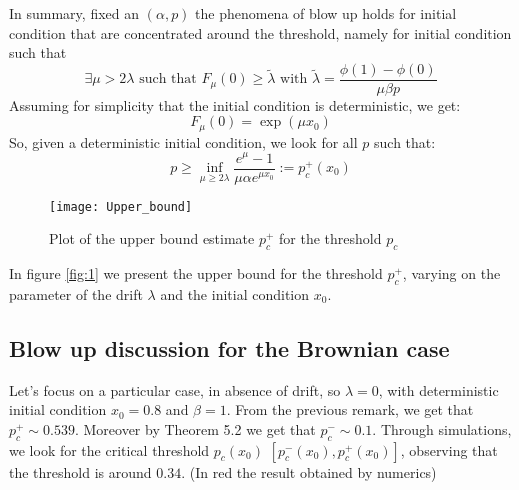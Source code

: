 \begin{remark}\label{rem: bu1}
In summary, fixed an $(\alpha,p)$ the phenomena of blow up holds for initial condition that are concentrated around the threshold, namely for initial condition such that
\[\exists \mu>2\lambda\text{ such that }F_\mu(0)\geq \tilde{\lambda}\text{ with }\tilde{\lambda}=\frac{\phi(1)-\phi(0)}{\mu\beta p} \]
Assuming for simplicity that the initial condition is deterministic, we get:
\[F_\mu(0)=\exp(\mu x_0)\]
So, given a deterministic initial condition, we look for all $p$ such that:
\[p\geq \inf_{\mu\geq 2\lambda}\frac{e^\mu-1}{\mu\alpha e^{\mu x_0}}:=p^+_c(x_0)\]

\begin{figure}
\centering
\texttt{[image: Upper\_bound]}
\caption{Plot of the upper bound estimate $p^+_c$ for the threshold $p_c$}
\end{figure}\label{fig:1}
In figure \ref{fig:1} we present the upper bound for the threshold $p^+_c$, varying on the parameter of the drift $\lambda$ and the initial condition $x_0$.
\end{remark}

\subsection{Blow up discussion for the Brownian case}
Let's focus on a particular case, in absence of drift, so $\lambda=0$, with deterministic initial condition $x_0=0.8$ and $\beta=1$. From the previous remark, we get that $p^+_c\sim 0.539$. Moreover by Theorem 5.2 we get that $p^-_c\sim 0.1$.
Through simulations, we look for the critical threshold $p_c(x_0)$ $[p^-_c(x_0),p^+_c(x_0)]$, observing that the threshold is around $0.34$. (In red the result obtained by numerics)\\ 



